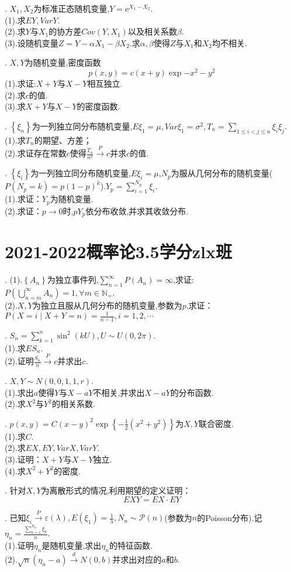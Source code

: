 . $X_1,X_2$为标准正态随机变量,$Y=\mathrm{e}^{X_1-X_2}$.\\
(1).求$EY,VarY$.\\
(2).求$Y$与$X_1$的协方差$Cov(Y,X_1)$以及相关系数$\beta$.\\
(3).设随机变量$Z=Y-\alpha X_1-\beta X_2$.求$\alpha,\beta$使得$Z$与$X_1$和$X_2$均不相关.

. $X,Y$为随机变量,密度函数
$$p(x,y)=c(x+y)\exp{-x^2-y^2}$$
(1).求证:$X+Y$与$X-Y$相互独立.\\
(2).求$c$的值.\\
(3).求$X+Y$与$X-Y$的密度函数.

. $\left\{\xi_n\right\}$为一列独立同分布随机变量,$E\xi_1=\mu,Var\xi_1=\sigma^2,T_n=\sum_{1\leq i<j\leq n}\xi_i\xi_j$.\\
(1).求$T_n$的期望、方差；\\
(2).求证存在常数$c$使得$\frac{T_n}{n^2}\xrightarrow{P}c$并求$c$的值.

. $\left\{\xi_i\right\}$为一列独立同分布随机变量,$E\xi_i=\mu$,$N_p$为服从几何分布的随机变量($P(N_p=k)=p(1-p)^k$).$Y_p=\sum_{i=1}^{N_p}\xi_i$.\\
(1).求证：$Y_p$为随机变量.\\
(2).求证：$p\to 0$时,$pY_p$依分布收敛,并求其收敛分布.
\newpage
\section{2021-2022概率论3.5学分zlx班}
. (1).$\left\{A_n\right\}$为独立事件列,$\sum_{n=1}^{\infty}P(A_n)=\infty$,求证:$P\left(\bigcup_{n=m}^{\infty}A_n\right)=1,\forall m\in \mathbb{N}_+$.\\
(2).$X,Y$为独立且服从几何分布的随机变量,参数为$p$,求证：$P(X=i\mid X+Y=n)=\frac{1}{n-1},i=1,2,\cdots$

. $S_n=\sum_{k=1}^n\sin^2(kU),U\sim U(0,2\pi)$.\\
(1).求$ES_n$.\\
(2).证明$\frac{S_n}{n}\xrightarrow{P}c$并求出$c$.

. $X,Y\sim N(0,0,1,1,r)$.\\
(1).求出$a$使得$Y$与$X-aY$不相关,并求出$X-aY$的分布函数.\\
(2).求$X^2$与$Y^2$的相关系数.

. $p(x,y)=C(x-y)^2\exp{\left\{-\frac{1}{2}(x^2+y^2)\right\}}$为$X,Y$联合密度.\\
(1).求$C$.\\
(2).求$EX,EY,VarX,VarY$.\\
(3).证明：$X+Y$与$X-Y$独立.\\
(4).求$X^2+Y^2$的密度.

. 针对$X,Y$为离散形式的情况,利用期望的定义证明：$$EXY=EX\cdot EY$$

. 已知$\xi_i\xrightarrow{P}\varepsilon(\lambda),E(\xi_1)=\frac{1}{\lambda},N_n\sim \mathcal{P}(n)$(参数为$n$的Poisson分布).记$\eta_n=\frac{\sum_{k=1}^{N_n}\xi_k}{n}$.\\
(1).证明$\eta_n$是随机变量,求出$\eta_n$的特征函数.\\
(2).$\sqrt{n}(\eta_n-a)\xrightarrow{d}N(0,b)$并求出对应的$a$和$b$.


